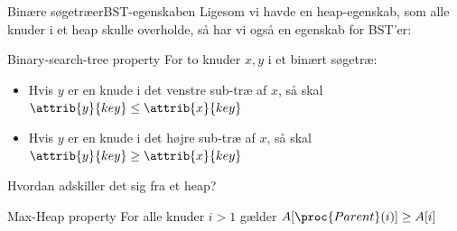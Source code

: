 \documentclass[aspectratio=1610]{beamer}
\begin{document}
\begin{frame}{Binære søgetræer}{BST-egenskaben}
    Ligesom vi havde en heap-egenskab, som alle knuder i et heap skulle
    overholde, så har vi også en egenskab for BST'er:

    \pause
    \begin{block}{Binary-search-tree property}
        For to knuder $x, y$ i et binært søgetræ:

        \begin{itemize}
            \item Hvis $y$ er en knude i det venstre sub-træ af $x$, så skal
                $\attrib{y}{key} \leq \attrib{x}{key}$ 
            \item Hvis $y$ er en knude i det højre sub-træ af $x$, så skal
                $\attrib{y}{key} \geq \attrib{x}{key}$ 
        \end{itemize}
    \end{block}

    \pause
    Hvordan adskiller det sig fra et heap?

    \pause
    \begin{block}{Max-Heap property}
        For alle knuder $i > 1$ gælder $A[\proc{Parent}(i)] \geq A[i]$
    \end{block}
\end{frame}
\end{document}
